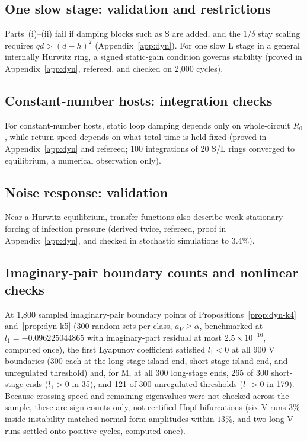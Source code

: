 \subsection{One slow stage: validation and restrictions}\label{esm:trim-dyn-k6}
Parts~(i)--(ii) fail if damping blocks such as S are added, and the $1/\delta$ stay scaling requires $qd > (d - h)^2$ (Appendix~\ref{app:dyn}). For one slow L stage in a general internally Hurwitz ring, a signed static-gain condition governs stability (proved in Appendix~\ref{app:dyn}, refereed, and checked on 2,000 cycles).

\subsection{Constant-number hosts: integration checks}\label{esm:trim-dyn-k8}
For constant-number hosts, static loop damping depends only on whole-circuit $R_0$, while return speed depends on what total time is held fixed (proved in Appendix~\ref{app:dyn} and refereed; 100 integrations of 20 S/L rings converged to equilibrium, a numerical observation only).

\subsection{Noise response: validation}\label{esm:trim-dyn-k9}
Near a Hurwitz equilibrium, transfer functions also describe weak stationary forcing of infection pressure \citep[compare][]{roberts1992,marion2000} (derived twice, refereed, proof in Appendix~\ref{app:dyn}, and checked in stochastic simulations to $3.4\%$).

\subsection{Imaginary-pair boundary counts and nonlinear checks}\label{esm:trim-hopf}
At 1,800 sampled imaginary-pair boundary points of Propositions~\ref{prop:dyn-k4} and~\ref{prop:dyn-k5} (300 random sets per class, $a_V \ge \alpha$, benchmarked at $l_1 = -0.096225044865$ with imaginary-part residual at most $2.5 \times 10^{-16}$, computed once), the first Lyapunov coefficient satisfied $l_1 < 0$ at all 900 V boundaries (300 each at the long-stage island end, short-stage island end, and unregulated threshold) and, for M, at all 300 long-stage ends, 265 of 300 short-stage ends ($l_1 > 0$ in 35), and 121 of 300 unregulated thresholds ($l_1 > 0$ in 179). Because crossing speed and remaining eigenvalues were not checked across the sample, these are sign counts only, not certified Hopf bifurcations (six V runs $3\%$ inside instability matched normal-form amplitudes within $13\%$, and two long V runs settled onto positive cycles, computed once).

